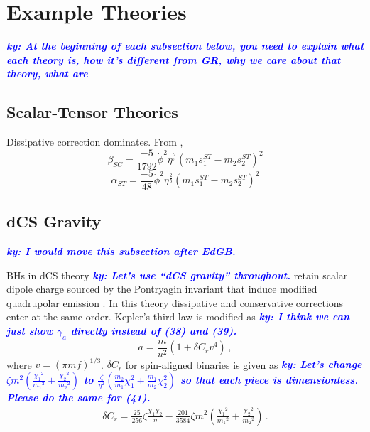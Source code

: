 \documentclass[11pt]{article}
\newcommand{\ky}[1]{\textcolor{blue}{\it{\textbf{ky: #1}}} }
\begin{document}
 \section{Example Theories}
 \vspace*{20pt}

\ky{At the beginning of each subsection below, you need to explain what each theory is, how it's different from GR, why we care about that theory, what are }

 \subsection{Scalar-Tensor Theories}
 Dissipative correction dominates.  From \cite{Yunes:2016jcc},
 \begin{equation}
 \beta_{SC}=\frac{-5}{1792}\dot{\phi}^2\eta^{\frac{2}{5}}(m_1s_1^{ST}-m_2s_2^{ST})^2
 \end{equation}
 \begin{equation}
 \alpha_{ST}=\frac{-5}{48}\dot{\phi}^2\eta^{\frac{2}{5}}(m_1s_1^{ST}-m_2s_2^{ST})^2
 \end{equation}
 
 \subsection{dCS Gravity}
 
 \ky{I would move this subsection after EdGB.}
 
\hspace{15.5pt}BHs in dCS theory \ky{Let's use ``dCS gravity'' throughout.} retain scalar dipole charge sourced by the Pontryagin invariant that induce modified quadrupolar emission \cite{Yagi:2011xp,Yunes:2016jcc}. In this theory dissipative and conservative corrections enter at the same order. Kepler's third law is modified as \cite{Yagi:2012vf} \ky{I think we can just show $\gamma_a$ directly instead of (38) and (39).}
 \begin{equation}\label{eq:3.3a}
 a=\frac{m}{u^2}(1+\delta C_r v^4)\,,
 \end{equation}
where $v=(\pi m f)^{1/3}$. $\delta C_r$ for  spin-aligned binaries is given as  \ky{Let's change $\zeta m^2 \left(\frac{{\chi_1}^2}{{m_1}^2}+\frac{{\chi_2}^2}{{m_2}^2}\right)$ to $\frac{\zeta}{\eta^2}\left(\frac{m_2}{m_1}\chi_1^2+\frac{m_1}{m_2}\chi_2^2\right)$ so that each piece is dimensionless. Please do the same for (41).}
\begin{align}
\delta C_r=\frac{25}{256}\zeta \frac{\chi_1 \chi_2}{\eta}-\frac{201}{3584}\zeta m^2\left(\frac{{\chi_1}^2}{{m_1}^2}+\frac{{\chi_2}^2}{{m_2}^2}\right)\,.
\end{align} 
\end{document}
